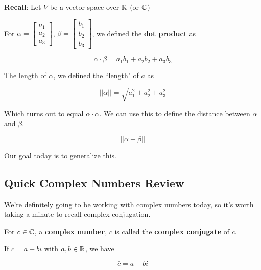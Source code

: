 \documentclass[12pt]{article}
\begin{document}
  {\bf Recall}: Let $V$ be a vector space over ${\mathbb R}$ (or ${\mathbb C}$)

  \Definition{}
  {
    For $\alpha = \begin{bmatrix} a_1 \\ a_2 \\ a_3 \end{bmatrix}$, $\beta =
    \begin{bmatrix} b_1 \\ b_2 \\ b_3 \end{bmatrix}$, we defined the {\bf dot
    product} as

    \[
      \alpha \cdot \beta = a_1 b_1 + a_2 b_2 + a_3 b_3
    \]
  }

  The length of $\alpha$, we defined the ``length" of $a$ as

  \[
    ||\alpha|| = \sqrt{a_1^2 + a_2^2 + a_3^2}
  \]

  Which turns out to equal $\alpha \cdot \alpha$. We can use this to define the
  distance between $\alpha$ and $\beta$.

  \[
    ||\alpha - \beta||
  \]

  Our goal today is to generalize this.

  \subsection*{Quick Complex Numbers Review}

  We're definitely going to be working with complex numbers today, so it's worth
  taking a minute to recall complex conjugation.

  \Definition{}
  {
    For $c \in {\mathbb C}$, a {\bf complex number}, $\bar c$ is called the {\bf complex
    conjugate} of $c$.

    If $c = a + bi$ with $a, b \in {\mathbb R}$, we have 

    \[
      \bar c = a - bi
    \]
  }
\end{document}
